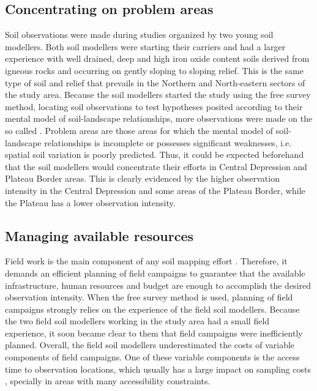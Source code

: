 \subsection{Concentrating on problem areas}
\label{subsec:chap06-conceptual}

Soil observations were made during studies organized by two young soil modellers. Both soil modellers were 
starting their carriers and had a larger experience with well drained, deep and high iron oxide content soils 
derived from igneous rocks and occurring on gently sloping to sloping relief. This is the same type of soil and
relief that prevails in the Northern and North-eastern sectors of the study area. Because the soil 
modellers started the study using the free survey method, locating soil observations to test hypotheses 
posited according to their mental model of soil-landscape relationships, more observations were made on the so 
called  \cite{Rossiter2000}. Problem areas are those areas for which the mental model of 
soil-landscape relationships is incomplete or possesses significant weaknesses, i.e. spatial soil variation is 
poorly predicted. Thus, it could be expected beforehand that the soil modellers would concentrate their 
efforts in Central Depression and Plateau Border areas. This is clearly evidenced by the higher observation 
intensity in the Central Depression and some areas of the Plateau Border, while the Plateau has a lower 
observation intensity.

\subsection{Managing available resources}

Field work is the main component of any soil mapping effort \cite{KempenEtAl2012}. Therefore, it demands an 
efficient planning of field campaigns to guarantee that the available infrastructure, human resources and 
budget are enough to accomplish the desired observation intensity. When the free survey method is used, 
planning of field campaigns strongly relies on the experience of the field soil modellers. Because the two 
field soil modellers working in the study area had a small field experience, it soon became clear to them
that field campaigns were inefficiently planned. Overall, the field soil modellers underestimated the costs of
variable components of field campaigns. One of these variable components is the access time to observation 
locations, which usually has a large impact on sampling costs \cite{DomburgEtAl1997}, specially in areas with 
many accessibility constraints.

